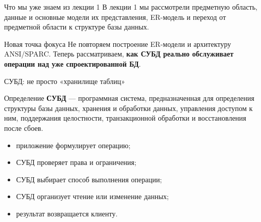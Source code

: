 \documentclass[aspectratio=169]{beamer}
\begin{document}
\begin{frame}{Что мы уже знаем из лекции 1}
\small
В лекции 1 мы рассмотрели предметную область, данные и основные модели их представления,
ER-модель и переход от предметной области к структуре базы данных.

\vspace{0.35cm}
\begin{center}
\end{center}

\vspace{0.3cm}
\begin{alertblock}{Новая точка фокуса}
Не повторяем построение ER-модели и архитектуру ANSI/SPARC. Теперь рассматриваем,
\textbf{как СУБД реально обслуживает операции над уже спроектированной БД}.
\end{alertblock}
\end{frame}

\begin{frame}{СУБД: не просто «хранилище таблиц»}
\begin{block}{Определение}
\textbf{СУБД} — программная система, предназначенная для определения структуры базы данных,
хранения и обработки данных, управления доступом к ним, поддержания целостности,
транзакционной обработки и восстановления после сбоев.
\end{block}

\vspace{0.35cm}
\begin{itemize}
  \item приложение формулирует операцию;
  \item СУБД проверяет права и ограничения;
  \item СУБД выбирает способ выполнения операции;
  \item СУБД организует чтение или изменение данных;
  \item результат возвращается клиенту.
\end{itemize}
\end{frame}
\end{document}

